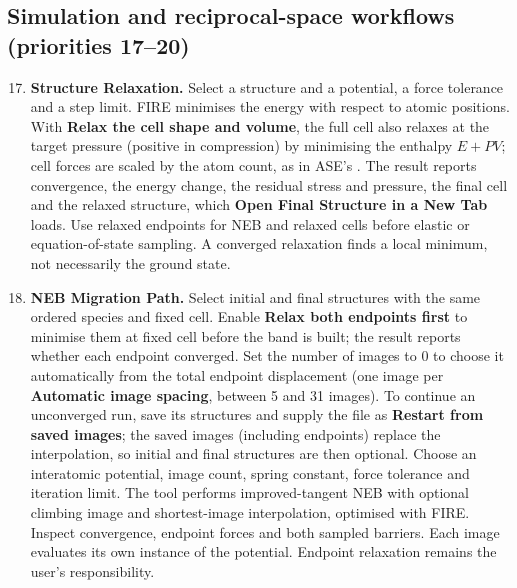 \subsection{Simulation and reciprocal-space workflows (priorities 17--20)}
\begin{enumerate}\setcounter{enumi}{16}
\item \textbf{Structure Relaxation.} Select a structure and a potential, a force tolerance and a step limit. FIRE minimises the energy with respect to atomic positions. With \textbf{Relax the cell shape and volume}, the full cell also relaxes at the target pressure (positive in compression) by minimising the enthalpy $E+PV$; cell forces are scaled by the atom count, as in ASE's . The result reports convergence, the energy change, the residual stress and pressure, the final cell and the relaxed structure, which \textbf{Open Final Structure in a New Tab} loads. Use relaxed endpoints for NEB and relaxed cells before elastic or equation-of-state sampling. A converged relaxation finds a local minimum, not necessarily the ground state.
\item \textbf{NEB Migration Path.} Select initial and final structures with the same ordered species and fixed cell. Enable \textbf{Relax both endpoints first} to minimise them at fixed cell before the band is built; the result reports whether each endpoint converged. Set the number of images to 0 to choose it automatically from the total endpoint displacement (one image per \textbf{Automatic image spacing}, between 5 and 31 images). To continue an unconverged run, save its structures and supply the file as \textbf{Restart from saved images}; the saved images (including endpoints) replace the interpolation, so initial and final structures are then optional. Choose an interatomic potential, image count, spring constant, force tolerance and iteration limit. The tool performs improved-tangent NEB with optional climbing image and shortest-image interpolation, optimised with FIRE. Inspect convergence, endpoint forces and both sampled barriers. Each image evaluates its own instance of the potential. Endpoint relaxation remains the user's responsibility.

\end{enumerate}
